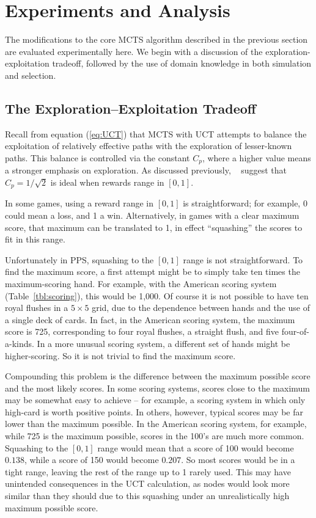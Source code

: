 \documentclass[letterpaper]{article}
\begin{document}
\section{Experiments and Analysis}

The modifications to the core MCTS algorithm described in the previous section are evaluated experimentally here. We begin with a discussion of the exploration-exploitation tradeoff, followed by the use of domain knowledge in both simulation and selection.

\subsection{The Exploration--Exploitation Tradeoff}
Recall from equation (\ref{eq:UCT}) that MCTS with UCT attempts to balance the exploitation of relatively effective paths with the exploration of lesser-known paths. This balance is controlled via the constant $C_p$, where a higher value means a stronger emphasis on exploration. As discussed previously, ~\cite{kocsis2006improved} suggest that $C_p=1 / \sqrt{2}$ is ideal when rewards range in $[0,1]$. 

In some games, using a reward range in $[0,1]$ is straightforward; for example, 0 could mean a loss, and 1 a win. Alternatively, in games with a clear maximum score, that maximum can be translated to 1, in effect ``squashing'' the scores to fit in this range.

Unfortunately in PPS, squashing to the $[0,1]$ range is not straightforward. To find the maximum score, a first attempt might be to simply take ten times the maximum-scoring hand. For example, with the American scoring system (Table~\ref{tbl:scoring}), this would be 1,000. Of course it is not possible to have ten royal flushes in a $5\times5$ grid, due to the dependence between hands and the use of a single deck of cards. In fact, in the American scoring system, the maximum score is 725, corresponding to four royal flushes, a straight flush, and five four-of-a-kinds. In a more unusual scoring system, a different set of hands might be higher-scoring. So it is not trivial to find the maximum score.

Compounding this problem is the difference between the maximum possible score and the most likely scores. In some scoring systems, scores close to the maximum may be somewhat easy to achieve -- for example, a scoring system in which only high-card is worth positive points. In others, however, typical scores may be far lower than the maximum possible. In the American scoring system, for example, while 725 is the maximum possible, scores in the 100's are much more common. Squashing to the $[0,1]$ range would mean that a score of 100 would become $0.138$, while a score of 150 would become $0.207$. So most scores would be in a tight range, leaving the rest of the range up to 1 rarely used. This may have unintended consequences in the UCT calculation, as nodes would look more similar than they should due to this squashing under an unrealistically high maximum possible score.
\end{document}
